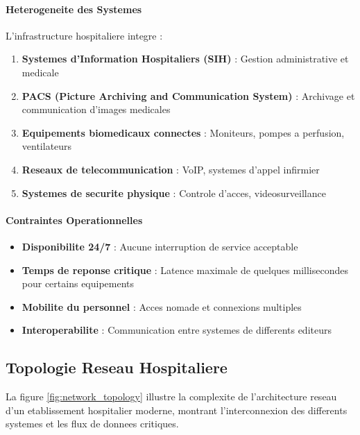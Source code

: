 \paragraph{Heterogeneite des Systemes}
L'infrastructure hospitaliere integre :
\begin{enumerate}
    \item \textbf{Systemes d'Information Hospitaliers (SIH)} : Gestion administrative et medicale
    \item \textbf{PACS (Picture Archiving and Communication System)} : Archivage et communication d'images medicales
    \item \textbf{Equipements biomedicaux connectes} : Moniteurs, pompes a perfusion, ventilateurs
    \item \textbf{Reseaux de telecommunication} : VoIP, systemes d'appel infirmier
    \item \textbf{Systemes de securite physique} : Controle d'acces, videosurveillance
\end{enumerate}

\paragraph{Contraintes Operationnelles}
\begin{itemize}
    \item \textbf{Disponibilite 24/7} : Aucune interruption de service acceptable
    \item \textbf{Temps de reponse critique} : Latence maximale de quelques millisecondes pour certains equipements
    \item \textbf{Mobilite du personnel} : Acces nomade et connexions multiples
    \item \textbf{Interoperabilite} : Communication entre systemes de differents editeurs
\end{itemize}

\subsection{Topologie Reseau Hospitaliere}

La figure \ref{fig:network_topology} illustre la complexite de l'architecture reseau d'un etablissement hospitalier moderne, montrant l'interconnexion des differents systemes et les flux de donnees critiques.


